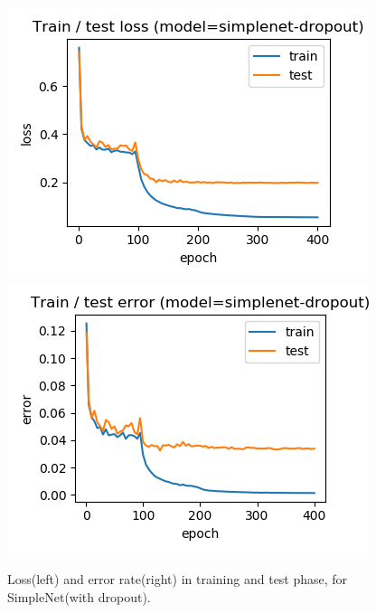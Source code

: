\documentclass[journal]{IEEEtran}
\begin{document}
\begin{figure}[htb]
  \includegraphics[width=\linewidth]{images/simplenet-dropout-loss.png}
\endminipage\hfill
{}
  \includegraphics[width=\linewidth]{images/simplenet-dropout-error.png}
\endminipage
\caption{Loss(left) and error rate(right) in training and test phase, for SimpleNet(with dropout).}\label{fig:simplenet-dropout_loss}
\end{figure}
\end{document}
